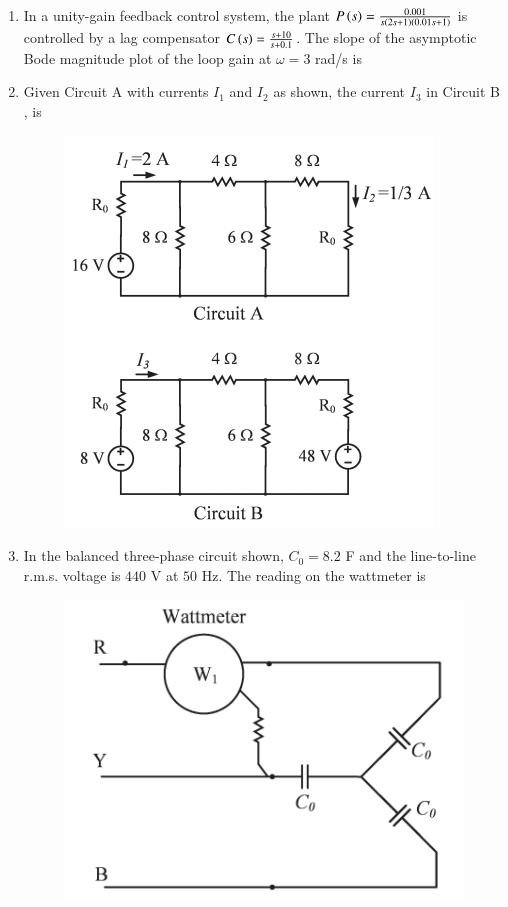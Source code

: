 \documentclass[journal,12pt,onecolumn]{IEEEtran}
\theoremstyle{remark}
\begin{document}
\begin{enumerate}
\hfill{}

\item In a unity-gain feedback control system, the plant $P\left(s\right) = \frac{0.001}{s\left(2s+1\right)\left(0.01s+1\right)}$ is controlled by a lag compensator $C\left(s\right) = \frac{s+10}{s+0.1}$. The slope  of the asymptotic Bode magnitude plot of the loop gain at $\omega = 3$ rad/s is \underline{\hspace{2cm}} 

\hfill{}

\newpage

\item Given Circuit A with currents $I_1$ and $I_2$ as shown, the current $I_3$ in Circuit B , is \underline{\hspace{2cm}}

\hfill{}

\begin{figure}[H]
\includegraphics[width = 0.6\columnwidth]{q54}
\caption*{}
\label{q54}
\end{figure}

\item In the balanced three-phase circuit shown, $C_0 = 8.2$ \textmu F and the line-to-line r.m.s. voltage is $440$ V at $50$ Hz. The reading on the wattmeter  is \underline{\hspace{2cm}} 

\hfill{}
\begin{figure}[H]
\includegraphics[width = 0.5\columnwidth]{q55}
\caption*{}
\label{q55}
\end{figure}


\end{enumerate}
\end{document}
